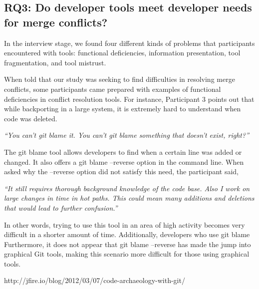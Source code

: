 \subsection{RQ3: Do developer tools meet developer needs for merge conflicts?}\label{RQ3}

In the interview stage, we found four different kinds of problems that participants encountered with tools: functional deficiencies, information presentation, tool fragmentation, and tool mistrust. 


When told that our study was seeking to find difficulties in resolving merge conflicts, some participants came prepared with examples of functional deficiencies in conflict resolution tools. For instance, Participant 3 points out that while backporting in a large system, it is extremely hard to understand when code was deleted. 

\begin{displayquote}
\textit{``You can't git blame it. You can't git blame something that doesn't exist, right?''}
\end{displayquote}

The git blame tool allows developers to find when a certain line was added or changed. It also offers a git blame --reverse option in the command line. When asked why the --reverse option did not satisfy this need, the participant said, 

\begin{displayquote}
\textit{``It still requires thorough background knowledge of the code base. Also I work on large changes in time in hot paths. This could mean many additions and deletions that would lead to further confusion.''}
\end{displayquote}

 In other words, trying to use this tool in an area of high activity becomes very difficult in a shorter amount of time. Additionally, developers who use git blame Furthermore, it does not appear that git blame --reverse has made the jump into graphical Git tools, making this scenario more difficult for those using graphical tools.


http://jfire.io/blog/2012/03/07/code-archaeology-with-git/


